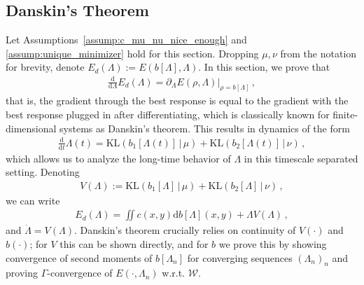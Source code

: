 \documentclass[11pt,a4paper,final]{article}
\newcommand{\KL}[2]{\text{KL}(#1\,|\,#2)}
\def\R{\mathbb R}
\newcommand{\Wass}{\mathscr{W}}
\DeclareMathOperator{\Id}{I}
\newcommand{\Hess}[1]{\text{Hess}\left( #1 \right)}
\renewcommand{\d}{\mathrm{d}}
\newcommand{\ddt}{\frac{\d}{\d t}}
\newcommand{\norm}[1]{\left\lVert#1\right\rVert}
\newcommand{\1}{\mathbf{1}}
\theoremstyle{plain}
\newtheorem{lemma}[theorem]{Lemma}
\numberwithin{equation}{section}
\numberwithin{theorem}{section}
\begin{document}
\subsection{Danskin's Theorem}\label{subsec:danskin}
Let Assumptions~\ref{assump:c_mu_nu_nice_enough} and \ref{assump:unique_minimizer} hold for this section. Dropping $\mu,\nu$ from the notation for brevity, denote 
$E_d(\Lambda):= E(b[\Lambda],\Lambda)$.
In this section, we prove that \begin{align*}
    \frac{\d}{\d \Lambda} E_d(\Lambda) = \partial_\Lambda E(\rho,\Lambda)|_{\rho=b[\Lambda]}\,,
\end{align*}
that is, the gradient through the best response is equal to the gradient with the best response plugged in after differentiating, which is classically known for finite-dimensional systems as Danskin's theorem. This results in dynamics of the form
\begin{align*}
    \ddt \Lambda(t) = \KL{b_1[\Lambda(t)]}{\mu} + \KL{b_2[\Lambda(t)]}{\nu}\,,
\end{align*}
which allows us to analyze the long-time behavior of $\Lambda$ in this timescale separated setting. Denoting 
\begin{align}\label{def:V}
   V(\Lambda):=\KL{b_1[\Lambda]}{\mu} + \KL{b_2[\Lambda]}{\nu}\,,
\end{align}
we can write 
\begin{align*}
    E_d(\Lambda) = \iint c(x,y) \d b[\Lambda](x,y) + \Lambda V(\Lambda)\,,
\end{align*}
and $\dot\Lambda=V(\Lambda)$. Danskin's theorem crucially relies on continuity of $V(\cdot)$ and $b(\cdot)$; for $V$ this can be shown directly, and for $b$ we prove this by showing convergence of second moments of $b[\Lambda_n]$ for converging sequences $(\Lambda_n)_n$ and proving $\Gamma$-convergence of $E(\cdot,\Lambda_n)$ w.r.t. $\Wass$.
\end{document}
